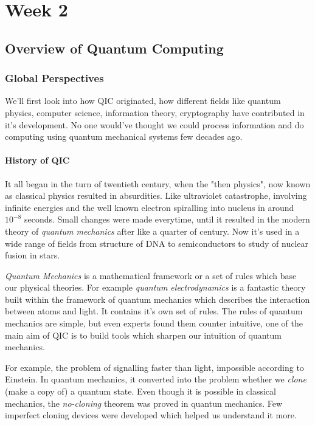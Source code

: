 \part{Week 2}
\chapter{Overview of Quantum Computing}

\section{Global Perspectives}
We'll first look into how QIC originated, how different fields like quantum physics, computer science, information theory, cryptography have contributed in it's development. No one would've thought we could process information and do computing using quantum mechanical systems few decades ago.
\subsection{History of QIC}
It all began in the turn of twentieth century, when the "then physics", now known as classical physics resulted in absurdities. Like ultraviolet catastrophe, involving infinite energies and the well known electron spiralling into nucleus in around $10^{-8}$ seconds. Small changes were made everytime, until it resulted in the modern theory of \textit{quantum mechanics} after like a quarter of century. Now it's used in a wide range of fields from structure of DNA to semiconductors to study of nuclear fusion in stars.

\textit{Quantum Mechanics} is a mathematical framework or a set of rules which base our physical theories. For example \textit{quantum electrodynamics} is a fantastic theory built within the framework of quantum mechanics which describes the interaction between atoms and light. It contains it's own set of rules. The rules of quantum mechanics are simple, but even experts found them counter intuitive, one of the main aim of QIC is to build tools which sharpen our intuition of quantum mechanics.

For example, the problem of signalling faster than light, impossible according to Einstein. In quantum mechanics, it converted into the problem whether we \textit{clone} (make a copy of) a quantum state. Even though it is possible in classical mechanics, the \textit{no-cloning} theorem was proved in quantun mechanics. Few imperfect cloning devices were developed which helped us understand it more.

